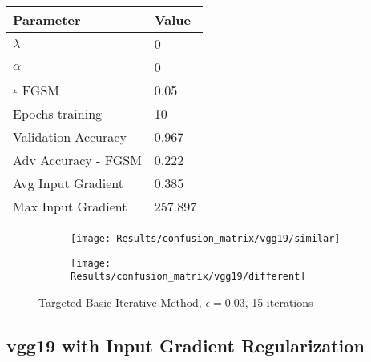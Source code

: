 \documentclass[draft,final]{vutinfth} %
\begin{document}
\begin{table}[h]
  \centering
  \begin{tabular}{ll}
    \toprule
			Parameter			& Value   \\
    \midrule
			$\lambda$								& 0				\\
			$\alpha$								& 0				\\
			$\epsilon$ FGSM					& 0.05		\\
			Epochs training					& 10			\\
			
			Validation Accuracy			& 0.967		\\ 
			Adv Accuracy - FGSM			& 0.222		\\
			
			Avg Input Gradient			& 0.385	\\
			Max Input Gradient			& 257.897\\
    \bottomrule
  \end{tabular}
\end{table}


\begin{figure}[h]
  \begin{subfigure}[b]{0.5\columnwidth}
		\centering
    \texttt{[image: Results/confusion\_matrix/vgg19/similar]}
    \label{fig:exp:cm:vgg19:similar}
  \end{subfigure}
  \begin{subfigure}[b]{0.5\columnwidth}
		\centering
    \texttt{[image: Results/confusion\_matrix/vgg19/different]}
    \label{fig:exp:cm:vgg19:different}
  \end{subfigure}
  \caption{Targeted Basic Iterative Method, $\epsilon = 0.03$, 15 iterations}
  \label{fig:exp:cm:vgg19}
\end{figure}
\clearpage



\subsection{vgg19 with Input Gradient Regularization}
\end{document}
